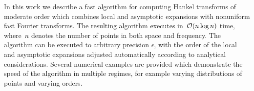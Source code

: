 In this work we describe a fast algorithm for computing Hankel transforms of
moderate order which combines local and asymptotic expansions with nonuniform
fast Fourier transforms. The resulting algorithm executes in~$\mathcal{O} (n \log n)$
time, where~$n$ denotes the number of points in both space and frequency.  The
algorithm can be executed to arbitrary precision $\epsilon$, with the order of
the local and asymptotic expansions adjusted automatically according to
analytical considerations. Several numerical examples are provided which
demonstrate the speed of the algorithm in multiple regimes, for example varying
distributions of points and varying orders.

